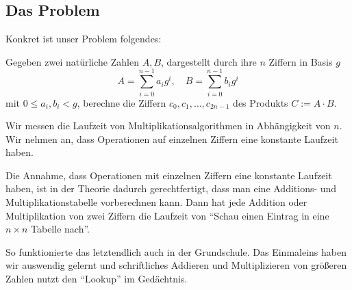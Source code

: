 
\subsection{Das Problem}\label{problem-description}

\begin{remark}
    Konkret ist unser Problem folgendes:

    \medskip
    Gegeben zwei natürliche Zahlen $A,B$, dargestellt durch ihre $n$ Ziffern in Basis $g$
    \[A=\sum_{i=0}^{n-1} a_i g^i,\quad B=\sum_{i=0}^{n-1} b_i g^i\]
    mit $0\leq a_i,b_i<g$, berechne die Ziffern $c_0, c_1, \ldots, c_{2n-1}$ des Produkts $C:=A\cdot B$.

    \medskip
    Wir messen die Laufzeit von Multiplikationsalgorithmen in Abhängigkeit von $n$. Wir nehmen an, dass Operationen auf einzelnen Ziffern eine konstante Laufzeit haben.
\end{remark}

\begin{remark}
    Die Annahme, dass Operationen mit einzelnen Ziffern eine konstante Laufzeit haben, ist in der Theorie dadurch gerechtfertigt, dass man eine Additions- und Multiplikationstabelle vorberechnen kann. Dann hat jede Addition oder Multiplikation von zwei Ziffern die Laufzeit von \enquote{Schau einen Eintrag in eine $n\times n$ Tabelle nach}.

    So funktionierte das letztendlich auch in der Grundschule. Das Einmaleins haben wir auswendig gelernt und schriftliches Addieren und Multiplizieren von größeren Zahlen nutzt den \enquote{Lookup} im Gedächtnis.
\end{remark}

